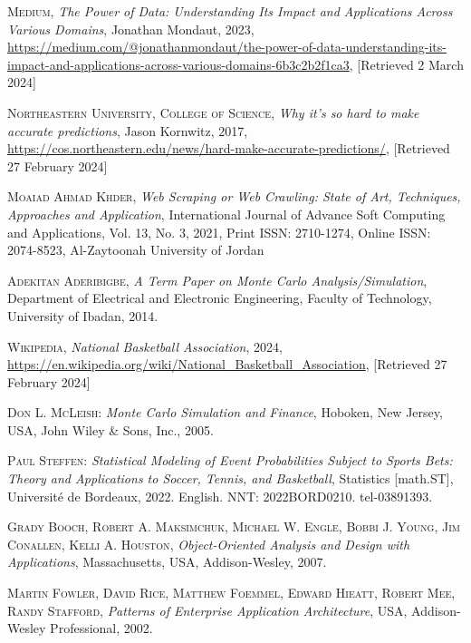 \documentclass{thesis-ekf}
\theoremstyle{definition}
\theoremstyle{remark}
\begin{document}
\begin{thebibliography}{2}

\textsc{Medium}, 
\emph {The Power of Data: Understanding Its Impact and Applications Across Various Domains}, Jonathan Mondaut, 2023, \url{https://medium.com/@jonathanmondaut/the-power-of-data-understanding-its-impact-and-applications-across-various-domains-6b3c2b2f1ca3}, [Retrieved 2 March 2024]

\textsc{Northeastern University, College of Science},
\emph{Why it’s so hard to make accurate predictions}, Jason Kornwitz, 2017, \url{https://cos.northeastern.edu/news/hard-make-accurate-predictions/}, [Retrieved 27 February 2024]

\textsc{Moaiad Ahmad Khder},
\emph{Web Scraping or Web Crawling: State of Art, Techniques, Approaches and Application}, 
International Journal of Advance Soft Computing and Applications, 
Vol. 13, No. 3, 2021, 
Print ISSN: 2710-1274, Online ISSN: 2074-8523, 
Al-Zaytoonah University of Jordan

\textsc{Adekitan Aderibigbe},
\emph{A Term Paper on Monte Carlo Analysis/Simulation},
Department of Electrical and Electronic Engineering,
Faculty of Technology, University of Ibadan,
2014.

\textsc{Wikipedia},
\emph{National Basketball Association}, 2024, 
\url{https://en.wikipedia.org/wiki/National_Basketball_Association}, [Retrieved 27 February 2024]

\textsc{Don L. McLeish}: 
\emph{Monte Carlo Simulation and Finance}, 
Hoboken, New Jersey, USA, John Wiley \& Sons, Inc., 2005.

\textsc{Paul Steffen}:
\emph{Statistical Modeling of Event Probabilities Subject to Sports Bets: Theory and Applications to Soccer, Tennis, and Basketball},
Statistics [math.ST], Université de Bordeaux, 2022.
English.
NNT: 2022BORD0210.
tel-03891393.

\textsc{Grady Booch, Robert A. Maksimchuk, Michael W. Engle, Bobbi J. Young, Jim Conallen, Kelli A. Houston},
\emph{Object-Oriented Analysis and Design with Applications}, 
Massachusetts, USA, Addison-Wesley, 2007.

\textsc{Martin Fowler, David Rice, Matthew Foemmel, Edward Hieatt, Robert Mee, Randy Stafford},
\emph{Patterns of Enterprise Application Architecture},
USA, Addison-Wesley Professional, 2002.


\end{thebibliography}
\end{document}
